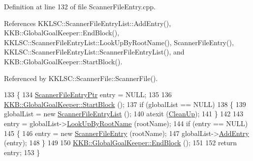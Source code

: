Definition at line 132 of file Scanner\+File\+Entry.\+cpp.



References K\+K\+L\+S\+C\+::\+Scanner\+File\+Entry\+List\+::\+Add\+Entry(), K\+K\+B\+::\+Global\+Goal\+Keeper\+::\+End\+Block(), K\+K\+L\+S\+C\+::\+Scanner\+File\+Entry\+List\+::\+Look\+Up\+By\+Root\+Name(), Scanner\+File\+Entry(), K\+K\+L\+S\+C\+::\+Scanner\+File\+Entry\+List\+::\+Scanner\+File\+Entry\+List(), and K\+K\+B\+::\+Global\+Goal\+Keeper\+::\+Start\+Block().



Referenced by K\+K\+L\+S\+C\+::\+Scanner\+File\+::\+Scanner\+File().


\begin{DoxyCode}
133 \{
134   \hyperlink{namespace_k_k_l_s_c_a54ff7eab3cb7195f02302b70282bfa8d}{ScannerFileEntryPtr}  entry = NULL;
135 
136   \hyperlink{class_k_k_b_1_1_global_goal_keeper_a05d7aab73a0cc12c01f4dd6e8d3da839}{KKB::GlobalGoalKeeper::StartBlock} ();
137   \textcolor{keywordflow}{if}  (globalList == NULL)
138   \{
139     globalList = \textcolor{keyword}{new} \hyperlink{class_k_k_l_s_c_1_1_scanner_file_entry_list}{ScannerFileEntryList} ();
140     atexit (\hyperlink{class_k_k_l_s_c_1_1_scanner_file_entry_adde202e21a7097e9f571d9793e0e4c69}{CleanUp});
141   \}
142 
143   entry = globalList->\hyperlink{class_k_k_l_s_c_1_1_scanner_file_entry_list_ab10ca380be8b53029b09f49e70e12d78}{LookUpByRootName} (rootName);
144   \textcolor{keywordflow}{if}  (entry == NULL)
145   \{
146     entry = \textcolor{keyword}{new} \hyperlink{class_k_k_l_s_c_1_1_scanner_file_entry_ae5a17e4b65dcce8e9b689f711aa19daf}{ScannerFileEntry} (rootName);
147     globalList->\hyperlink{class_k_k_l_s_c_1_1_scanner_file_entry_list_a74ba98ac8d6c6d7d8479af46f6c8cb9c}{AddEntry} (entry);
148   \}
149 
150   \hyperlink{class_k_k_b_1_1_global_goal_keeper_a4e03a2807ca2f00c359da8625afb4cc5}{KKB::GlobalGoalKeeper::EndBlock} ();
151 
152   \textcolor{keywordflow}{return}  entry;
153 \}
\end{DoxyCode}
